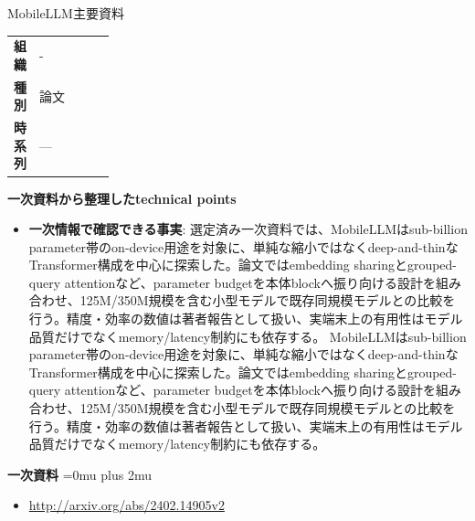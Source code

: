 \begin{technicalnote}{MobileLLM}{主要資料}
\begingroup
\begin{tabularx}{\linewidth}{@{}>{\bfseries}p{0.22\linewidth}X@{}}
組織 & - \\
種別 & 論文 \\
時系列 & — \\
\end{tabularx}
\smallskip
\begin{minipage}{\linewidth}
{\bfseries 一次資料から整理したtechnical points}
\begin{itemize}[leftmargin=1.5em,itemsep=0.35em]
\item \textbf{一次情報で確認できる事実}: 選定済み一次資料では、MobileLLMはsub-billion parameter帯のon-device用途を対象に、単純な縮小ではなくdeep-and-thinなTransformer構成を中心に探索した。論文ではembedding sharingとgrouped-query attentionなど、parameter budgetを本体blockへ振り向ける設計を組み合わせ、125M/350M規模を含む小型モデルで既存同規模モデルとの比較を行う。精度・効率の数値は著者報告として扱い、実端末上の有用性はモデル品質だけでなくmemory/latency制約にも依存する。 MobileLLMはsub-billion parameter帯のon-device用途を対象に、単純な縮小ではなくdeep-and-thinなTransformer構成を中心に探索した。論文ではembedding sharingとgrouped-query attentionなど、parameter budgetを本体blockへ振り向ける設計を組み合わせ、125M/350M規模を含む小型モデルで既存同規模モデルとの比較を行う。精度・効率の数値は著者報告として扱い、実端末上の有用性はモデル品質だけでなくmemory/latency制約にも依存する。
\end{itemize}
\begin{minipage}{\linewidth}
\begin{samepage}
{\bfseries 一次資料}
\begingroup\sloppy
\Urlmuskip=0mu plus 2mu\relax
\begin{itemize}[leftmargin=1.5em,itemsep=0.25em]
\item {\scriptsize\url{http://arxiv.org/abs/2402.14905v2}}
\end{itemize}
\endgroup
\end{samepage}
\end{minipage}
\end{minipage}
\endgroup
\end{technicalnote}
\medskip

